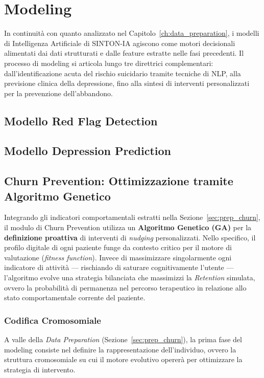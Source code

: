 \chapter{Modeling}
\label{ch:modeling}

In continuità con quanto analizzato nel Capitolo~\ref{ch:data_preparation}, i modelli di Intelligenza Artificiale di SINTON-IA agiscono come motori decisionali alimentati dai dati strutturati e dalle feature estratte nelle fasi precedenti. Il processo di modeling si articola lungo tre direttrici complementari: dall'identificazione acuta del rischio suicidario tramite tecniche di NLP, alla previsione clinica della depressione, fino alla sintesi di interventi personalizzati per la prevenzione dell'abbandono.

\section{Modello Red Flag Detection}
\section{Modello Depression Prediction}

\section{Churn Prevention: Ottimizzazione tramite Algoritmo Genetico}
\label{sec:churn_modeling}

Integrando gli indicatori comportamentali estratti nella Sezione~\ref{sec:prep_churn}, il modulo di Churn Prevention utilizza un \textbf{Algoritmo Genetico (GA)} per la \textbf{definizione proattiva} di interventi di \textit{nudging} \cite{thaler2008nudge} personalizzati. Nello specifico, il profilo digitale di ogni paziente funge da contesto critico per il motore di valutazione (\textit{fitness function}). Invece di massimizzare singolarmente ogni indicatore di attività --- rischiando di saturare cognitivamente l'utente --- l'algoritmo evolve una strategia bilanciata che massimizzi la \textit{Retention} simulata, ovvero la probabilità di permanenza nel percorso terapeutico in relazione allo stato comportamentale corrente del paziente.

\subsection{Codifica Cromosomiale}
A valle della \textit{Data Preparation} (Sezione~\ref{sec:prep_churn}), la prima fase del modeling consiste nel definire la rappresentazione dell'individuo, ovvero la struttura cromosomiale su cui il motore evolutivo opererà per ottimizzare la strategia di intervento.

